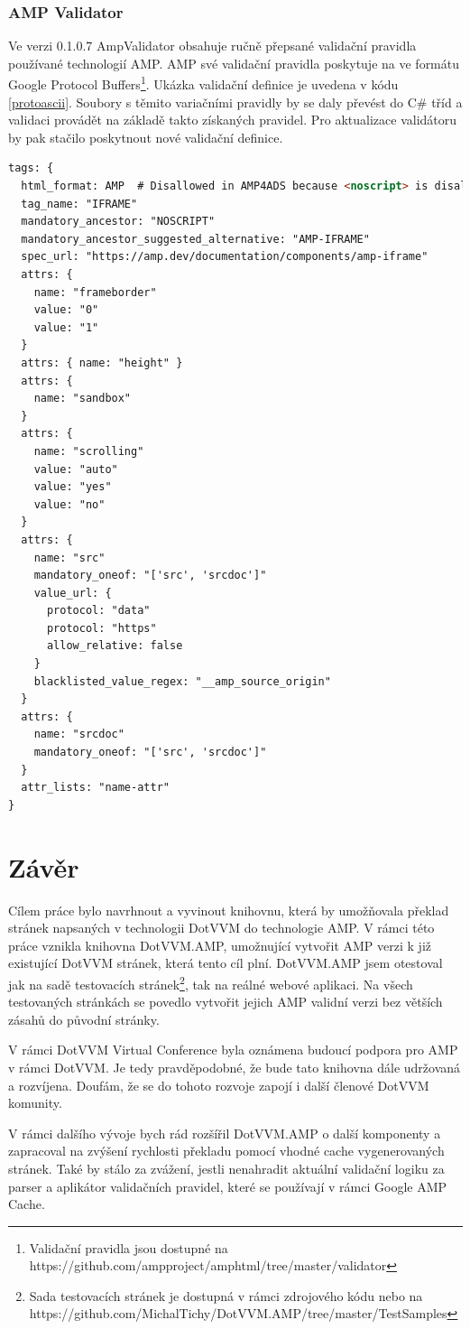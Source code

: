 \subsection{AMP Validator}
Ve verzi 0.1.0.7 AmpValidator obsahuje ručně přepsané validační pravidla používané technologií AMP. AMP své validační pravidla poskytuje na ve formátu Google Protocol Buffers\footnote{Validační pravidla jsou dostupné na https://github.com/ampproject/amphtml/tree/master/validator}. Ukázka validační definice je uvedena v kódu \ref{protoascii}.  Soubory s těmito variačními pravidly by se daly převést do C\# tříd a validaci provádět na základě takto získaných pravidel. Pro aktualizace validátoru by pak stačilo poskytnout nové validační definice.

\begin{lstlisting}[language=html, caption=Ukázka části validačního pravidla pro iframe v rámci protoascii souboru.,label=protoascii,captionpos=t]
tags: {
  html_format: AMP  # Disallowed in AMP4ADS because <noscript> is disallowed.
  tag_name: "IFRAME"
  mandatory_ancestor: "NOSCRIPT"
  mandatory_ancestor_suggested_alternative: "AMP-IFRAME"
  spec_url: "https://amp.dev/documentation/components/amp-iframe"
  attrs: {
    name: "frameborder"
    value: "0"
    value: "1"
  }
  attrs: { name: "height" }
  attrs: {
    name: "sandbox"
  }
  attrs: {
    name: "scrolling"
    value: "auto"
    value: "yes"
    value: "no"
  }
  attrs: {
    name: "src"
    mandatory_oneof: "['src', 'srcdoc']"
    value_url: {
      protocol: "data"
      protocol: "https"
      allow_relative: false
    }
    blacklisted_value_regex: "__amp_source_origin"
  }
  attrs: {
    name: "srcdoc"
    mandatory_oneof: "['src', 'srcdoc']"
  }
  attr_lists: "name-attr"
}
\end{lstlisting}

\chapter{Závěr}
Cílem práce bylo navrhnout a vyvinout knihovnu, která by umožňovala překlad stránek napsaných v technologii DotVVM do technologie AMP. V rámci této práce vznikla knihovna DotVVM.AMP, umožnující vytvořit AMP verzi k již existující DotVVM stránek, která tento cíl plní. DotVVM.AMP jsem otestoval jak na sadě testovacích stránek\footnote{ Sada testovacích stránek je dostupná v rámci zdrojového kódu nebo na https://github.com/MichalTichy/DotVVM.AMP/tree/master/TestSamples}, tak na reálné webové aplikaci. Na všech testovaných stránkách se povedlo vytvořit jejich AMP validní verzi bez větších zásahů do původní stránky.

V rámci DotVVM Virtual Conference byla oznámena budoucí podpora pro AMP v rámci DotVVM. Je tedy pravděpodobné, že bude tato knihovna dále udržovaná a rozvíjena\cite{herceg_2020}.  Doufám, že se do tohoto rozvoje zapojí i další členové DotVVM komunity.

V rámci dalšího vývoje bych rád rozšířil DotVVM.AMP o další komponenty a zapracoval na zvýšení rychlosti překladu pomocí vhodné cache vygenerovaných stránek. Také by stálo za zvážení, jestli nenahradit aktuální validační logiku za parser a aplikátor validačních pravidel, které se používají v rámci Google AMP Cache.